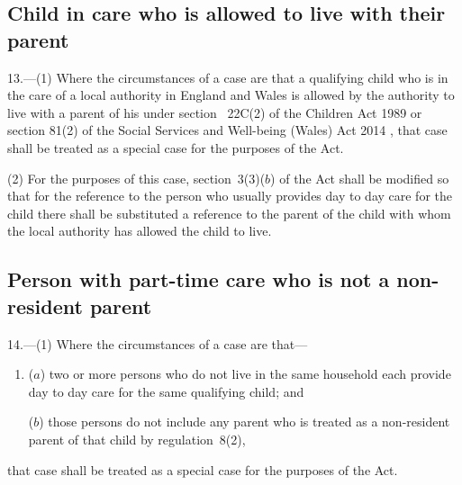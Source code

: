 \documentclass[12pt,a4paper]{article}
\begin{document}
\subsection[13. 
Child in care who is allowed to live with their parent  %
]{%
Child in care who is allowed to live with their parent  %
}

13.---(1)  Where the circumstances of a case are that a qualifying child who is in the care of a local authority in England and Wales is allowed by the authority to live with a parent of his under section~%
22C(2) 
of the Children Act 1989
or section 81(2) of the Social Services and Well-being (Wales) Act 2014%
, that case shall be treated as a special case for the purposes of the Act.

(2) For the purposes of this case, section~3(3)($b$)  of the Act shall be modified so that for the reference to the person who usually provides day to day care for the child there shall be substituted a reference to the parent of the child with whom the local authority 
has allowed the child to live.  %


\subsection[14. Person with part-time care who is not a non-resident parent]{Person with part-time care who is not a non-resident parent}

14.---(1)  Where the circumstances of a case are that—
\begin{enumerate}\item[]
($a$) two or more persons who do not live in the same household each provide day to day care for the same qualifying child; and

($b$) those persons do not include any parent who is treated as a non-resident parent of that child by regulation~8(2),
\end{enumerate}
that case shall be treated as a special case for the purposes of the Act.
\end{document}
